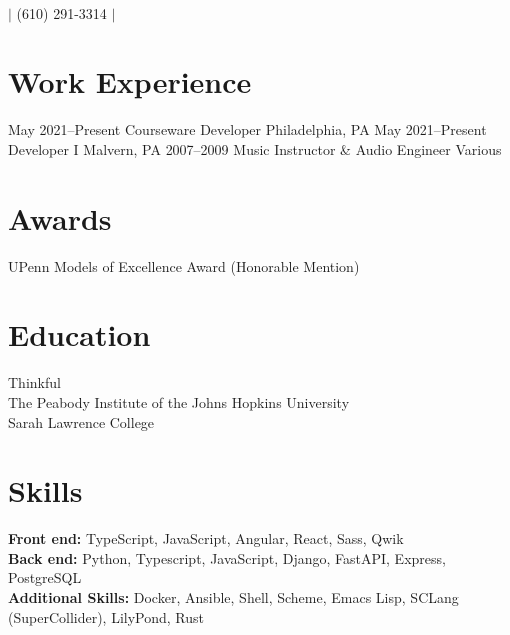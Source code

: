 \documentclass{article}
\begin{document}
 \\
$|$
\small{(610) 291-3314}
$|$

\section*{Work Experience}

\begin{itemize}[leftmargin=0em, label={}]
             {May 2021--Present}
             {Courseware Developer}
             {Philadelphia, PA}
             {May 2021--Present}
             {Developer I}
             {Malvern, PA}
             {2007--2009}
             {Music Instructor \& Audio Engineer}
             {Various}
\end{itemize}

\section*{Awards}

UPenn Models of Excellence Award (Honorable Mention)

\section*{Education}

Thinkful \\
The Peabody Institute of the Johns Hopkins University \\
Sarah Lawrence College

\section*{Skills}

\textbf{Front end:} TypeScript, JavaScript, Angular, React, Sass, Qwik \\
\textbf{Back end:} Python, Typescript, JavaScript, Django, FastAPI, Express,
  PostgreSQL \\
\textbf{Additional Skills:} Docker, Ansible, Shell, Scheme, Emacs Lisp, SCLang
  (SuperCollider), LilyPond, Rust
\end{document}
